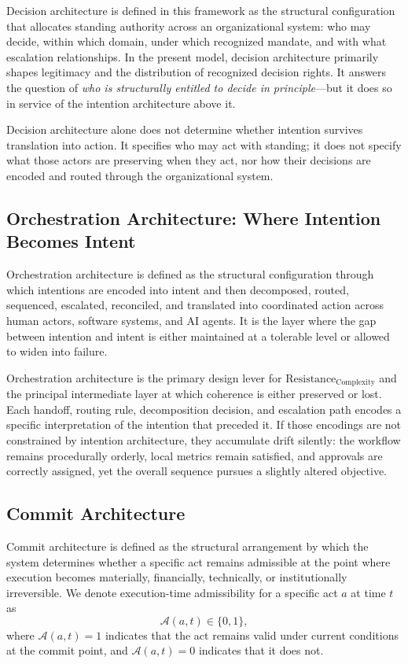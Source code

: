 \documentclass[12pt]{article}
\begin{document}
Decision architecture is defined in this framework as the structural
configuration that allocates standing authority across an organizational
system: who may decide, within which domain, under which recognized mandate,
and with what escalation relationships. In the present model, decision
architecture primarily shapes legitimacy and the distribution of recognized
decision rights. It answers the question of \emph{who is structurally entitled
to decide in principle}---but it does so in service of the intention
architecture above it.

Decision architecture alone does not determine whether intention survives
translation into action. It specifies who may act with standing; it does not
specify what those actors are preserving when they act, nor how their decisions
are encoded and routed through the organizational system.

\subsection{Orchestration Architecture: Where Intention Becomes Intent}
\label{sec:orchestration_architecture}

Orchestration architecture is defined as the structural configuration through
which intentions are encoded into intent and then decomposed, routed,
sequenced, escalated, reconciled, and translated into coordinated action
across human actors, software systems, and AI agents. It is the layer where
the gap between intention and intent is either maintained at a tolerable level
or allowed to widen into failure.

Orchestration architecture is the primary design lever for
$\text{Resistance}_{\text{Complexity}}$ and the principal intermediate layer
at which coherence is either preserved or lost. Each handoff, routing rule,
decomposition decision, and escalation path encodes a specific interpretation
of the intention that preceded it. If those encodings are not constrained by
intention architecture, they accumulate drift silently: the workflow remains
procedurally orderly, local metrics remain satisfied, and approvals are
correctly assigned, yet the overall sequence pursues a slightly altered
objective.

\subsection{Commit Architecture}
\label{sec:commit}

Commit architecture is defined as the structural arrangement by which the
system determines whether a specific act remains admissible at the point where
execution becomes materially, financially, technically, or institutionally
irreversible. We denote execution-time admissibility for a specific act $a$
at time $t$ as
\[
\mathcal{A}(a,t) \in \{0,1\},
\]
where $\mathcal{A}(a,t)=1$ indicates that the act remains valid under current
conditions at the commit point, and $\mathcal{A}(a,t)=0$ indicates that it
does not.
\end{document}
